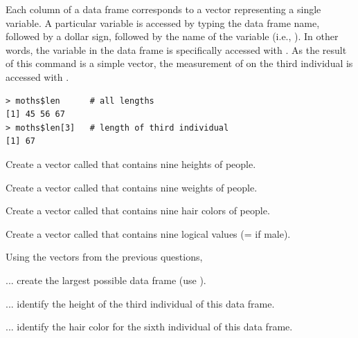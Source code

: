 \documentclass[10pt,openany]{book}\usepackage[]{graphicx}\usepackage[]{color}
\makeatletter
\newenvironment{kframe}{%
 \def\at@end@of@kframe{}%
 \ifinner\ifhmode%
  \def\at@end@of@kframe{\end{minipage}}%
  \begin{minipage}{\columnwidth}%
 \fi\fi%
 \def\FrameCommand##1{\hskip\@totalleftmargin \hskip-\fboxsep
 \colorbox{shadecolor}{##1}\hskip-\fboxsep
     \hskip-\linewidth \hskip-\@totalleftmargin \hskip\columnwidth}%
 \MakeFramed {\advance\hsize-\width
   \@totalleftmargin\z@ \linewidth\hsize
   \@setminipage}}%
 {\par\unskip\endMakeFramed%
 \at@end@of@kframe}
\newenvironment{knitrout}{}{} %
\makeatother
\begin{document}
Each column of a data frame corresponds to a vector representing a single variable.  A particular variable is accessed by typing the data frame name, followed by a dollar sign, followed by the name of the variable (i.e., ).  In other words, the  variable in the  data frame is specifically accessed with .  As the result of this command is a simple vector, the measurement of  on the third individual is accessed with .
\begin{knitrout}
\color{fgcolor}\begin{kframe}
\begin{verbatim}
> moths$len      # all lengths
[1] 45 56 67
> moths$len[3]   # length of third individual
[1] 67
\end{verbatim}
\end{kframe}
\end{knitrout}


\vspace{-12pt}

\begin{exsection}
  \item \label{revex:BasicsData1}\rhw{} Create a vector called  that contains nine heights of people. 
  \item \label{revex:BasicsData2}\rhw{} Create a vector called  that contains nine weights of people. 
  \item \label{revex:BasicsData3}\rhw{} Create a vector called  that contains nine hair colors of people. 
  \item \label{revex:BasicsData4}\rhw{} Create a vector called  that contains nine logical values (= if male). 
  \item \label{revex:BasicsData5}\rhw{} Using the vectors from the previous questions,  
  \begin{Enumerate}
    \item ... create the largest possible data frame (use ).
    \item ... identify the height of the third individual of this data frame.
    \item ... identify the hair color for the sixth individual of this data frame.
  \end{Enumerate}
\end{exsection}
\end{document}
